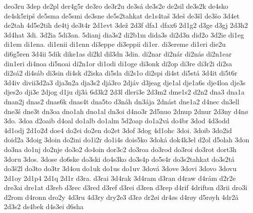 {    deo3ru
    3dep
    de2pl
    der4g5r
    de3ro
    de3r2u
    de3sá
    de3s2e
    de2sil
    de3s2k
    de4sko
    de4sk5ripš
    de5sma
    de5smi
    de3sne
    de5s2tahkat
    de1s4taš
    3deš
    de3šl
    de3šo
    3d4et
    de2tah
    4d5e2tih
    de4tj
    de3t4r
    2d1evt
    3dež
    2d3f
    dfa1
    dfax6
    2d1g2
    d3ge
    d3gj
    2d3h2
    3d4hat
    3di.
    3d2ia
    5di3an.
    5dianj
    dia3s2
    di2b1m
    dida3s
    di2d3n
    did2o
    3d2ie
    di1eg
    di1em
    di1ena.
    di1enii
    di1enn
    di3eppe
    di3eppii
    di1er.
    di3ereme
    di1eri
    die2u
    di6g5ren
    3d4ii
    5dik
    dike1as
    di2kl
    dil3dn
    3din.
    di2nar
    di2nár
    di2nás
    di2n1ear
    din1eri
    di4noa
    di5noai
    di2n1or
    di1odi
    di1oge
    di3onk
    di2op
    di3re
    di3r2i
    di2sa
    di2sá2
    di4sáb
    di3sin
    di4sk
    d2iska
    di5sla
    di2s1o
    di2spi
    di4st
    di5stá
    3d4it
    di5t6r
    3d4iv
    divii3d2a3
    dja3n2a
    dja3s2
    djá3ro
    2djáv
    d3jeag
    dje1al
    dje1a6s
    dje4loa
    dje3s
    djes2o
    dji3e
    2djog
    d1ju
    dj3å
    6d3k2
    2d3l
    dleri3e
    2d3m2
    dme1s2
    d2n2
    dna3
    dna1a
    dnan2j
    dnas2
    dnas6k
    dnas4t
    dna5to
    d3náh
    dn3ája
    2dnást
    dne1a2
    d4nec
    dn3ell
    dne3š
    dne3t
    dn3oa
    dno1ah
    dno1al
    dn3oi
    d4no3r
    2d5nuo
    2dnup
    2dnur
    2d3ny
    d4nø
    3do.
    3doa
    d2oaib
    d4oal
    do1alb
    do1alm
    5d2oap
    do1a2vá
    do4br
    3dod
    4d3odd
    4d1odj
    2d1o2đ
    doe4
    do2ei
    do2en
    do2et
    3dof
    3dog
    4d1ohc
    3doi.
    3doib
    3do2id
    doid2a
    3doig
    3doin
    do2ini
    do1i2r
    do1i4s
    dois5ko
    3doká
    dok4k3el
    d2ol
    d5olah
    3don
    do3na
    do1nj
    do2nje
    do3o2
    do4oin
    dor3c2
    do3roa
    do3rod
    do3roi
    do3rot
    dort3h
    3doru
    3dos.
    3dose
    do6ske
    do3ski
    do4s3ko
    do3s4p
    do5s4r
    do3s2tahkat
    do3s2tá
    do3š2l
    do3to
    do3tr
    3d4ou
    do1uk
    do1us
    do1uv
    3dová
    3dove
    3dovi
    3dovo
    3dovu
    2d1oy
    2d1p4
    2d1q
    2d1r
    d3ra.
    d3rai
    3d4rak
    3d4ram
    d3ran
    d4raw
    d4rám
    d2r2e
    dre3ai
    dre1at
    d3reb
    d3rec
    d3red
    d3ref
    d3rei
    d3ren
    d3rep
    d4rif
    4driftsn
    d3rii
    dro3i
    d2rom
    d4ronn
    dro2y
    4d3ru
    4d3ry
    dry2e3
    d3rø
    dr2øi
    dr4øs
    d4røy
    d5røyh
    4dr2å
    2d3s2
    ds4bek
    d4s3ei
    d6sha
}
